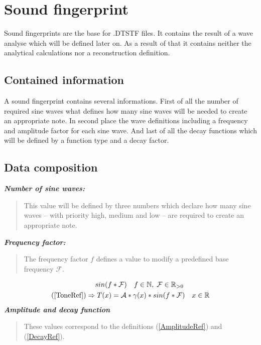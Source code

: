 \section{Sound fingerprint}
Sound fingerprints are the base for .DTSTF files. It contains the result of a wave analyse which will be defined later on. As a result of that it contains neither the analytical calculations nor a reconstruction definition.

\subsection{Contained information}
A sound fingerprint contains several informations. First of all the number of required sine waves what defines how many sine waves will be needed to create an appropriate note. In second place the wave definitions including a frequency and amplitude factor for each sine wave. And last of all the decay functions which will be defined by a function type and a decay factor.

\subsection{Data composition}
\textbf{\emph{Number of sine waves:}}
\begin{quote}
	This value will be defined by three numbers which declare how many sine waves -- with priority high, medium and low -- are required to create an appropriate note.
\end{quote}
\textbf{\emph{Frequency factor:}}
\begin{quote}
	The frequency factor $ f $ defines a value to modify a predefined base frequency $ \mathcal{F} $.
\end{quote}
\begin{eqnarray}
	& sin(f*\mathcal{F}) \quad f\in\mathbb{N}, \; \mathcal{F}\in\mathbb{R}_{>0}\nonumber \\
	(\ref{ToneRef})\Rightarrow & \; T(x)=\mathcal{A} * \gamma(x) * sin(f*\mathcal{F}) \quad x\in\mathbb{R}\nonumber
\end{eqnarray}
\textbf{\emph{Amplitude and decay function}}
\begin{quote}
	These values correspond to the definitions (\ref{AmplitudeRef}) and (\ref{DecayRef}).
\end{quote}


